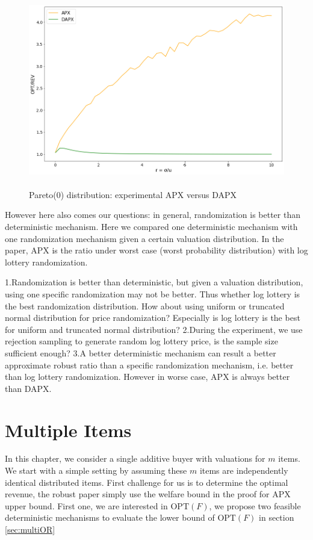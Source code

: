 \begin{figure}[H]
	\centering
	\includegraphics[width=1\textwidth,height=8.5cm]{apxpareto0.png}
	\caption{Pareto(0) distribution: experimental APX versus DAPX}
	\label{fig:apxpareto0}
\end{figure}





However here also comes our questions: in general, randomization is better than deterministic mechanism. Here we compared one deterministic mechanism with one randomization mechanism given a certain valuation distribution. In the paper, APX is the ratio under worst case (worst probability distribution) with log lottery randomization. 

1.Randomization is better than deterministic, but given a valuation distribution, using one specific randomization may not be better. Thus whether log lottery is the best randomization distribution. How about using uniform or truncated normal distribution for price randomization? Especially is log lottery is the best for uniform and truncated normal distribution?
2.During the experiment, we use rejection sampling to generate random log lottery price, is the sample size sufficient enough?
3.A better deterministic mechanism can result a better approximate robust ratio than a specific randomization mechanism, i.e. better than log lottery randomization. However in worse case, APX is always better than DAPX. 






\chapter{Multiple Items}
In this chapter, we consider a single additive buyer with valuations for $m$ items. We start with a simple setting by assuming these $m$ items are independently identical distributed items. First challenge for us is to determine the optimal revenue, the robust paper simply use the welfare bound in the proof for APX upper bound. First one, we are interested in $\text{OPT}(F)$, we propose two feasible deterministic mechanisms to evaluate the lower bound of $\text{OPT}(F)$ in section \cref{sec:multiOR}

